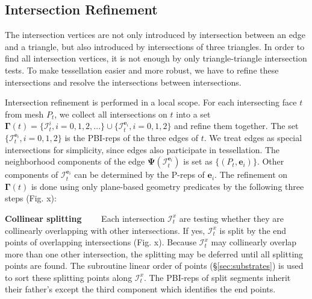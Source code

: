 \documentclass[10pt,journal,compsoc]{IEEEtran}
\begin{document}
\subsection{Intersection Refinement}


The intersection vertices are not only introduced by intersection between an edge and a triangle, but also introduced by intersections of three triangles. In order to find all intersection vertices, it is not enough by only triangle-triangle intersection tests. To make tessellation easier and more robust, we have to refine these intersections and resolve the intersections between intersections.

Intersection refinement is performed in a local scope. For each intersecting face $t$ from mesh $P_t$, we collect all intersections on $t$ into a set $\bm{\Gamma}(t)=\{\bm{\mathcal{I}}_{t}^i, i=0,1,2,...\}\cup\{\bm{\mathcal{I}}_{t}^{\bm{e}_i},i=0,1,2\}$ and refine them together. The set $\{\bm{\mathcal{I}}_{t}^{\bm{e}_i},i=0,1,2\}$ is the PBI-reps of the three edges of $t$. We treat edges as special intersections for simplicity, since edges also participate in tessellation. The neighborhood components of the edge $\bm{\Psi}(\bm{\mathcal{I}}_{t}^{\bm{e}_i})$ is set as $\{(P_t, \bm{e}_i )\}$. Other components of $\bm{\mathcal{I}}_{t}^{\bm{e}_i}$ can be determined by the P-reps of $\bm{e}_i$. The refinement on $\bm{\Gamma}(t)$ is done using only plane-based geometry predicates by the following three steps (Fig. x):

\vspace{0.5em}
\noindent \textbf{Collinear splitting}~~~~
Each intersection $\bm{\mathcal{I}}_{t}^x$ are testing whether they are collinearly overlapping with other intersections. If yes, $\bm{\mathcal{I}}_{t}^x$ is split by the end points of overlapping intersections (Fig. x). Because $\bm{\mathcal{I}}_{t}^x$ may collinearly overlap more than one other intersection, the splitting may be deferred until all splitting points are found. The subroutine linear order of points (\S\ref{sec:substrates}) is used to sort these splitting points along $\bm{\mathcal{I}}_{t}^x$. The PBI-reps of split segments inherit their father's except the third component which identifies the end points.
\end{document}
